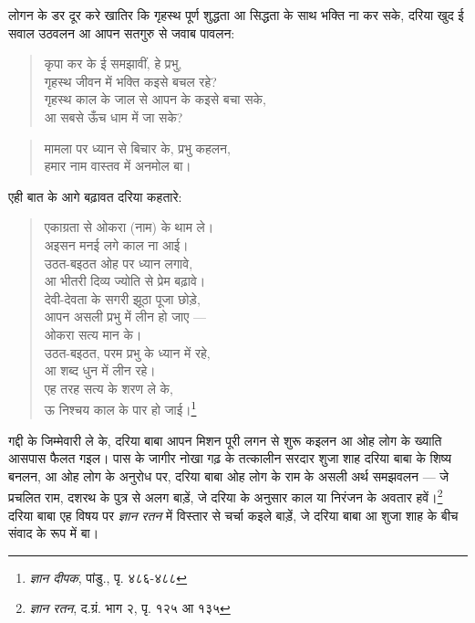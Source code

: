 लोगन के डर दूर करे खातिर कि गृहस्थ पूर्ण शुद्धता आ सिद्धता के साथ भक्ति ना कर सके, दरिया खुद ई सवाल उठवलन आ आपन सतगुरु से जवाब पावलन:

\medskip
{}

\begin{quote}
कृपा कर के ई समझावीं, हे प्रभु, \\
गृहस्थ जीवन में भक्ति कइसे बचल रहे? \\
गृहस्थ काल के जाल से आपन के कइसे बचा सके, \\
आ सबसे ऊँच धाम में जा सके?
\end{quote}

\medskip
{}

\begin{quote}
मामला पर ध्यान से बिचार के, प्रभु कहलन, \\
हमार नाम वास्तव में अनमोल बा।
\end{quote}
एही बात के आगे बढ़ावत दरिया कहतारे:

\begin{quote}
एकाग्रता से ओकरा (नाम) के थाम ले। \\
अइसन मनई लगे काल ना आई। \\
उठत-बइठत ओह पर ध्यान लगावे, \\
आ भीतरी दिव्य ज्योति से प्रेम बढ़ावे। \\
देवी-देवता के सगरी झूठा पूजा छोड़े, \\
आपन असली प्रभु में लीन हो जाए — \\
ओकरा सत्य मान के। \\
उठत-बइठत, परम प्रभु के ध्यान में रहे, \\
आ शब्द धुन में लीन रहे। \\
एह तरह सत्य के शरण ले के, \\
ऊ निश्चय काल के पार हो जाई।\footnote{\textit{ज्ञान दीपक}, पांडु., पृ. ४८६-४८८}
\end{quote}

गद्दी के जिम्मेवारी ले के, दरिया बाबा आपन मिशन पूरी लगन से शुरू कइलन आ ओह लोग के ख्याति आसपास फैलत गइल। पास के जागीर नोखा गढ़ के तत्कालीन सरदार शुजा शाह दरिया बाबा के शिष्य बनलन, आ ओह लोग के अनुरोध पर, दरिया बाबा ओह लोग के राम के असली अर्थ समझवलन — जे प्रचलित राम, दशरथ के पुत्र से अलग बाड़ें, जे दरिया के अनुसार काल या निरंजन के अवतार हवें।\footnote{\textit{ज्ञान रतन}, द.ग्रं. भाग २, पृ. १२५ आ १३५} दरिया बाबा एह विषय पर \textit{ज्ञान रतन} में विस्तार से चर्चा कइले बाड़ें, जे दरिया बाबा आ शुजा शाह के बीच संवाद के रूप में बा।

